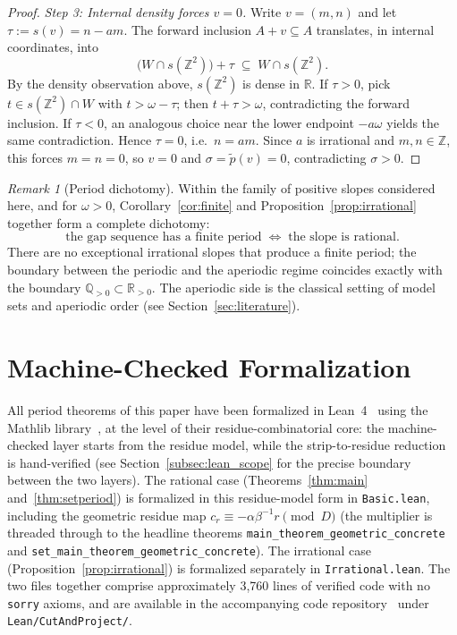 \documentclass[11pt,reqno]{amsart}
\theoremstyle{plain}
\theoremstyle{definition}
\theoremstyle{remark}
\newtheorem{remark}[theorem]{Remark}
\begin{document}
\begin{proof}
\emph{Step 3: Internal density forces \(v = 0\).}\quad
Write \(v = (m, n)\) and let \(\tau := s(v) = n - a m\).  The forward
inclusion \(A + v \subseteq A\) translates, in internal coordinates,
into
\[
    \bigl(W \cap s(\mathbb{Z}^2)\bigr) + \tau
    \;\subseteq\;
    W \cap s(\mathbb{Z}^2).
\]
By the density observation above, \(s(\mathbb{Z}^2)\) is dense in
\(\mathbb{R}\).  If \(\tau > 0\), pick
\(t \in s(\mathbb{Z}^2) \cap W\) with \(t > \omega - \tau\); then
\(t + \tau > \omega\), contradicting the forward inclusion.  If
\(\tau < 0\), an analogous choice near the lower endpoint \(-a\omega\)
yields the same contradiction.  Hence \(\tau = 0\), i.e.\ \(n = a m\).  Since \(a\) is
irrational and \(m, n \in \mathbb{Z}\), this forces \(m = n = 0\), so
\(v = 0\) and \(\sigma = \tilde p(v) = 0\), contradicting \(\sigma > 0\).
\end{proof}

\begin{remark}[Period dichotomy]\label{rem:dichotomy}
Within the family of positive slopes considered here, and for \(\omega > 0\),
Corollary~\ref{cor:finite} and Proposition~\ref{prop:irrational} together
form a complete dichotomy:
\[
    \text{the gap sequence has a finite period}
    \;\;\Longleftrightarrow\;\;
    \text{the slope is rational.}
\]
There are no exceptional irrational slopes that produce a finite period;
the boundary between the periodic and the aperiodic regime coincides exactly
with the boundary \(\mathbb{Q}_{>0} \subset \mathbb{R}_{>0}\).  The
aperiodic side is the classical setting of model sets and aperiodic order
(see Section~\ref{sec:literature}).
\end{remark}

\section{Machine-Checked Formalization}\label{sec:lean}

All period theorems of this paper have been formalized in
Lean~4~\cite{Moura2021} using the Mathlib library~\cite{Mathlib2020},
at the level of their residue-combinatorial core: the machine-checked
layer starts from the residue model, while the strip-to-residue
reduction is hand-verified (see Section~\ref{subsec:lean_scope} for
the precise boundary between the two layers).
The rational case (Theorems~\ref{thm:main} and~\ref{thm:setperiod})
is formalized in this residue-model form in
\texttt{Basic.lean}, including the geometric residue
map \(c_r \equiv -\alpha\beta^{-1}r \pmod{D}\) (the multiplier is
threaded through to the headline theorems
\texttt{main\_\allowbreak theorem\_\allowbreak geometric\_\allowbreak concrete}
and \texttt{set\_\allowbreak main\_\allowbreak theorem\_\allowbreak geometric\_\allowbreak concrete}).
The irrational case (Proposition~\ref{prop:irrational}) is formalized
separately in \texttt{Irrational.lean}.  The two files together
comprise approximately 3{,}760 lines of verified code with no
\texttt{sorry} axioms, and are available in the accompanying code
repository~\cite{Kunert2026} under \texttt{Lean/CutAndProject/}.
\end{document}
